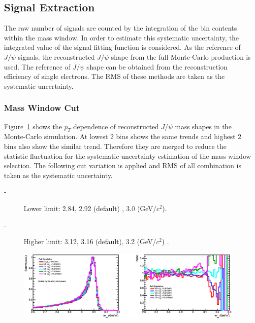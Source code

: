\subsection{Signal Extraction}
The raw number of signals are counted by the integration of the bin contents within the mass window. 
In order to estimate this systematic uncertainty, the integrated value of the signal fitting function is considered. 
As the reference of $J/\psi$ signals, the reconstructed $J/\psi$ shape from the full Monte-Carlo production is used. 
The reference of $J/\psi$ shape can be obtained from the reconstruction efficiency of single electrons. 
The RMS of these methods are taken as the systematic uncertainty. 

\subsubsection{Mass Window Cut}
Figure~\ref{fig_4_symassdep} shows the $p_{T}$ dependence of reconstructed $J/\psi$ mass shapes in the Monte-Carlo simulation. 
At lowest 2 bins shows the same trends and highest 2 bins also show the similar trend. 
Therefore they are merged to reduce the statistic fluctuation for the systematic uncertainty estimation of the mass window selection.  
The following cut variation is applied and RMS of all combination is taken as the systematic uncertainty. 
\begin{description}
  \item[-] Lower limit: 2.84, 2.92 (default) , 3.0 (GeV/$c^{2}$).
  \item[-] Higher limit: 3.12, 3.16 (default), 3.2 (GeV/$c^{2}$) .
\end{description}
\begin{figure}[!h]
  \centering
  \includegraphics[width=15cm]{chap4/figure/Systematics/MCRecontShape_PtDep_LHC13d10.eps}
  \caption{ }
  \label{fig_4_symassdep}
\end{figure}


